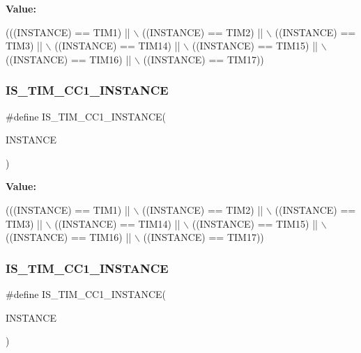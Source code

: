 {\bfseries Value\+:}
\begin{DoxyCode}
(((INSTANCE) == TIM1)    || \(\backslash\)
   ((INSTANCE) == TIM2)    || \(\backslash\)
   ((INSTANCE) == TIM3)    || \(\backslash\)
   ((INSTANCE) == TIM14)   || \(\backslash\)
   ((INSTANCE) == TIM15)   || \(\backslash\)
   ((INSTANCE) == TIM16)   || \(\backslash\)
   ((INSTANCE) == TIM17))
\end{DoxyCode}
\mbox{\label{group___exported__macro_ga0c02efc77b1bfb640d7f6593f58ad464}} 
\subsubsection{\texorpdfstring{I\+S\+\_\+\+T\+I\+M\+\_\+\+C\+C1\+\_\+\+I\+N\+S\+T\+A\+N\+CE}{IS\_TIM\_CC1\_INSTANCE}\hspace{0.1cm}{\footnotesize\ttfamily [14/16]}}
{\footnotesize\ttfamily \#define I\+S\+\_\+\+T\+I\+M\+\_\+\+C\+C1\+\_\+\+I\+N\+S\+T\+A\+N\+CE(\begin{DoxyParamCaption}\item[{}]{I\+N\+S\+T\+A\+N\+CE }\end{DoxyParamCaption})}

{\bfseries Value\+:}
\begin{DoxyCode}
(((INSTANCE) == TIM1)    || \(\backslash\)
   ((INSTANCE) == TIM2)    || \(\backslash\)
   ((INSTANCE) == TIM3)    || \(\backslash\)
   ((INSTANCE) == TIM14)   || \(\backslash\)
   ((INSTANCE) == TIM15)   || \(\backslash\)
   ((INSTANCE) == TIM16)   || \(\backslash\)
   ((INSTANCE) == TIM17))
\end{DoxyCode}
\mbox{\label{group___exported__macro_ga0c02efc77b1bfb640d7f6593f58ad464}} 
\subsubsection{\texorpdfstring{I\+S\+\_\+\+T\+I\+M\+\_\+\+C\+C1\+\_\+\+I\+N\+S\+T\+A\+N\+CE}{IS\_TIM\_CC1\_INSTANCE}\hspace{0.1cm}{\footnotesize\ttfamily [15/16]}}
{\footnotesize\ttfamily \#define I\+S\+\_\+\+T\+I\+M\+\_\+\+C\+C1\+\_\+\+I\+N\+S\+T\+A\+N\+CE(\begin{DoxyParamCaption}\item[{}]{I\+N\+S\+T\+A\+N\+CE }\end{DoxyParamCaption})}

